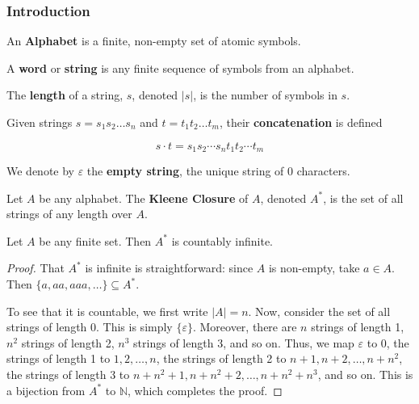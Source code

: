 \subsubsection{Introduction}\label{subsubsec:introduction}
\begin{definition}
 An \textbf{Alphabet} is a finite, non-empty set of atomic symbols.
\end{definition}

\begin{definition}
 A \textbf{word} or \textbf{string} is any finite sequence of symbols from an alphabet. 
\end{definition}

\begin{definition}
 The \textbf{length} of a string, $s$, denoted $|s|$, is the number of symbols in $s$. 
\end{definition}

\begin{definition}
 Given strings $s=s_1s_2\hdots s_n$ and $t=t_1t_2\hdots t_m$, their \textbf{concatenation} is defined 
 
 \[s\cdot t=s_1s_2\cdots s_nt_1t_2\cdots t_m\]
\end{definition}

We denote by $\varepsilon$ the \textbf{empty string}, the unique string of 0 characters. 

\begin{definition}
 Let $A$ be any alphabet. The \textbf{Kleene Closure} of $A$, denoted $A^*$, is the set of all strings of any length over $A$.  
\end{definition}

\begin{theorem}
 Let $A$ be any finite set. Then $A^*$ is countably infinite. 
\end{theorem}

\begin{proof}
 That $A^*$ is infinite is straightforward: since $A$ is non-empty, take $a\in A$. Then $\{a, aa, aaa, \hdots\}\subseteq A^*$.
 
 To see that it is countable, we first write $|A|=n$. Now, consider the set of all strings of length 0. This is simply $\{\varepsilon\}$. Moreover, there are $n$ strings of length 1, $n^2$ strings of length 2, $n^3$ strings of length 3, and so on. Thus, we map $\varepsilon$ to 0, the strings of length 1 to $1, 2, \hdots, n$, the strings of length 2 to $n+1, n+2, \hdots, n+n^2$, the strings of length 3 to $n+n^2+1, n+n^2+2,\hdots, n+n^2+n^3$, and so on. This is a bijection from $A^*$ to $\mathbb{N}$, which completes the proof.
\end{proof}

